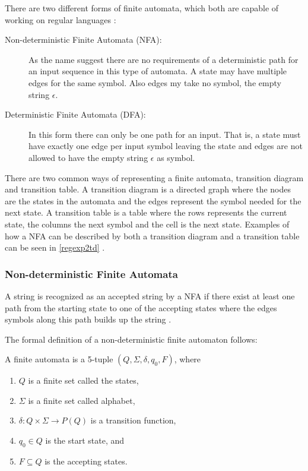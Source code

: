 There are two different forms of finite automata, which both are capable of
working on regular languages \cite{Aho2006}:
\begin{description}
\item [Non-deterministic Finite Automata (NFA):] As the name suggest there are no
requirements of a deterministic path for an input sequence in this type of
automata. A state may have multiple edges for the same symbol. Also edges my
take no symbol, the empty string $\epsilon$.
\item [Deterministic Finite Automata (DFA):] In this form there can only be one
path for an input. That is, a state must have exactly one edge per input symbol
leaving the state and edges are not allowed to have the empty string $\epsilon$
as symbol.
\end{description}

There are two common ways of representing a finite automata, transition diagram
and transition table. A transition diagram is a directed graph where the nodes
are the states in the automata and the edges represent the symbol needed for the
next state. A transition table is a table where the rows represents the current
state, the columns the next symbol and the cell is the next state. Examples of
how a NFA can be described by both a transition diagram and a transition table 
can be seen in \cref{regexp2td} \cite{Aho2006}.

\subsubsection{Non-deterministic Finite Automata}
A string is recognized as an accepted string by a NFA if there exist at least
one path from the starting state to one of the accepting states where the edges
symbols along this path builds up the string \cite{Aho2006}.

The formal definition of a non-deterministic finite automaton follows:

\begin{definition} \label{finiteAutomataDef}
A finite automata is a 5-tuple $(Q, \Sigma, \delta, q_0, F)$, where
\begin{enumerate}
  \item $Q$ is a finite set called the states,
  \item $\Sigma$ is a finite set called alphabet,
  \item $\delta: Q \times \Sigma \to P(Q)$ is a transition function,
  \item $q_0 \in Q$ is the start state, and
  \item $F \subseteq Q$ is the accepting states.
\end{enumerate} 
\end{definition}

